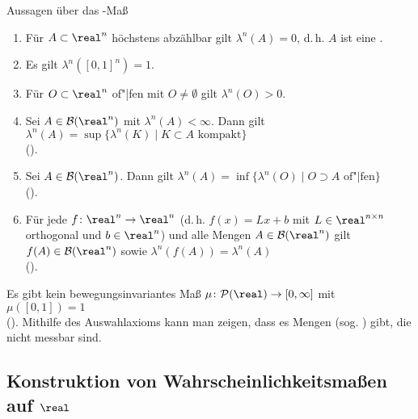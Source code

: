 \begin{Satz}{Aussagen über das -Maß}
    \begin{enumerate}
        \item
        Für $A \subset \real^n$ höchstens abzählbar gilt $\lambda^n(A) = 0$,
        d.\,h. $A$ ist eine .

        \item
        Es gilt $\lambda^n([0, 1]^n) = 1$.

        \item
        Für $O \subset \real^n$ of"|fen mit $O \not= \emptyset$ gilt $\lambda^n(O) > 0$.

        \item
        Sei $A \in \B(\real^n)$ mit $\lambda^n(A) < \infty$.
        Dann gilt $\lambda^n(A) = \sup\{\lambda^n(K) \;|\; K \subset A \text{ kompakt}\}$\\
        ().

        \item
        Sei $A \in \B(\real^n)$.
        Dann gilt $\lambda^n(A) = \inf\{\lambda^n(O) \;|\; O \supset A \text{ of"|fen}\}$\\
        ().

        \item
        Für jede  $f\colon \real^n \rightarrow \real^n$
        (d.\,h. $f(x) = Lx + b$ mit $L \in \real^{n \times n}$ orthogonal und $b \in \real^n$)
        und alle Mengen $A \in \B(\real^n)$ gilt
        $f(A) \in \B(\real^n)$ sowie $\lambda^n(f(A)) = \lambda^n(A)$\\
        ().
    \end{enumerate}
\end{Satz}

\begin{Bem}
    Es gibt kein bewegungsinvariantes Maß $\mu\colon \P(\real) \rightarrow [0, \infty]$ mit
    $\mu([0, 1]) = 1$\\
    ().
    Mithilfe des Auswahlaxioms kann man zeigen, dass es Mengen
    (sog. ) gibt, die nicht messbar sind.
\end{Bem}

\pagebreak

\subsection{%
    Konstruktion von Wahrscheinlichkeitsmaßen auf \texorpdfstring{$\real$}{ℝ}%
}

